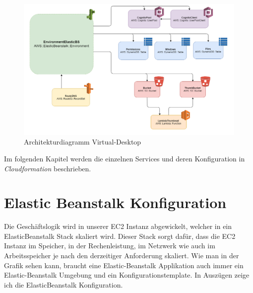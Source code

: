 \documentclass[a4paper, 12pt]{scrreprt}
\renewcommand\_{\textunderscore\allowbreak}
\begin{document}
\begin{figure}[h!]
\centering
\includegraphics[scale=0.45]{ArchiDiagram.png} 
\caption{Architekturdiagramm Virtual-Desktop}
\end{figure}

Im folgenden Kapitel werden die einzelnen Services und deren Konfiguration in \textit{Cloudformation} beschrieben. 

\newpage
\section{Elastic Beanstalk Konfiguration}
Die Geschäftslogik wird in unserer EC2 Instanz abgewickelt, welcher in ein ElasticBeanstalk Stack skaliert wird. Dieser Stack sorgt dafür, dass die EC2 Instanz im Speicher, in der Rechenleistung, im Netzwerk wie auch im Arbeitsspeicher je nach den derzeitiger Anforderung skaliert. Wie man in der Grafik sehen kann, braucht eine Elastic-Beanstalk Applikation auch immer ein Elastic-Beanstalk Umgebung und ein Konfigurationstemplate. In Auszügen zeige ich die ElasticBeanstalk Konfiguration.
\end{document}
